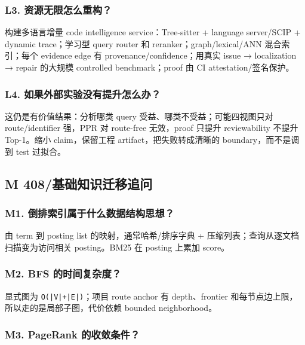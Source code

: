 \documentclass[UTF8,12pt,openany]{ctexbook}
\begin{document}
\subsubsection{L3. 资源无限怎么重构？}

构建多语言增量 code intelligence service：Tree-sitter + language server/SCIP + dynamic trace；学习型 query router 和 reranker；graph/lexical/ANN 混合索引；每个 evidence edge 有 provenance/confidence；用真实 issue → localization → repair 的大规模 controlled benchmark；proof 由 CI attestation/签名保护。\par

\subsubsection{L4. 如果外部实验没有提升怎么办？}

这仍是有价值结果：分析哪类 query 受益、哪类不受益；可能四视图只对 route/identifier 强，PPR 对 route-free 无效，proof 只提升 reviewability 不提升 Top-1。缩小 claim，保留工程 artifact，把失败转成清晰的 boundary，而不是调到 test 过拟合。\par

\subsection{M 408/基础知识迁移追问}

\subsubsection{M1. 倒排索引属于什么数据结构思想？}

由 term 到 posting list 的映射，通常哈希/排序字典 + 压缩列表；查询从逐文档扫描变为访问相关 posting。BM25 在 posting 上累加 score。\par

\subsubsection{M2. BFS 的时间复杂度？}

显式图为 \texttt{O(|V|+|E|)}；项目 route anchor 有 depth、frontier 和每节点边上限，所以走的是局部子图，代价依赖 bounded neighborhood。\par

\subsubsection{M3. PageRank 的收敛条件？}
\end{document}
